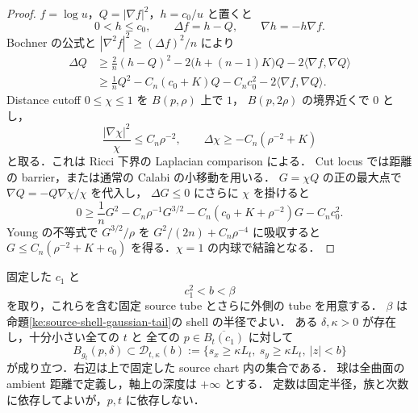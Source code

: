 \begin{proof}
$f=\log u$，$Q=|\nabla f|^2$，$h=c_0/u$ と置くと
\[
 0<h\le c_0,\qquad \Delta f=h-Q,\qquad \nabla h=-h\nabla f.
\]
Bochner の公式と $|\nabla^2 f|^2\ge(\Delta f)^2/n$ により
\begin{align*}
 \Delta Q
 &\ge \frac2n(h-Q)^2
      -2\bigl(h+(n-1)K\bigr)Q
      -2\langle\nabla f,\nabla Q\rangle\\
 &\ge \frac1n Q^2
      -C_n(c_0+K)Q-C_nc_0^2
      -2\langle\nabla f,\nabla Q\rangle.
\end{align*}
Distance cutoff $0\le\chi\le1$ を $B(p,\rho)$ 上で $1$，
$B(p,2\rho)$ の境界近くで $0$ とし，
\[
 \frac{|\nabla\chi|^2}{\chi}\le C_n\rho^{-2},\qquad
 \Delta\chi\ge-C_n(\rho^{-2}+K)
\]
と取る．これは Ricci 下界の Laplacian comparison による．
Cut locus では距離の barrier，または通常の Calabi の小移動を用いる．
$G=\chi Q$ の正の最大点で $\nabla Q=-Q\nabla\chi/\chi$ を代入し，
$\Delta G\le0$ にさらに $\chi$ を掛けると
\[
 0\ge \frac1n G^2-C_n\rho^{-1}G^{3/2}
       -C_n(c_0+K+\rho^{-2})G-C_nc_0^2.
\]
Young の不等式で $G^{3/2}/\rho$ を $G^2/(2n)+C_n\rho^{-4}$ に吸収すると
$G\le C_n(\rho^{-2}+K+c_0)$ を得る．$\chi=1$ の内球で結論となる．
\end{proof}

\begin{proposition}
\label{ke:source-potential-buffer}
固定した $c_1$ と
\[
 c_1^2<b<\beta
\]
を取り，これらを含む固定 source tube とさらに外側の tube を用意する．
$\beta$ は命題\ref{ke:source-shell-gaussian-tail}の shell の半径でよい．
ある $\delta,\kappa>0$ が存在し，十分小さい全ての $t$ と
全ての $p\in\overline{B_t(c_1)}$ に対して
\begin{equation}\label{ke:eq:source-potential-buffer}
 B_{g_t}(p,\delta)
 \subset\mathcal D_{t,\kappa}(b)
 :=\{s_x\ge\kappa L_t,\ s_y\ge\kappa L_t,\ |z|<b\}
\end{equation}
が成り立つ．右辺は上で固定した source chart 内の集合である．
球は全曲面の ambient 距離で定義し，軸上の深度は $+\infty$ とする．
定数は固定半径，族と次数に依存してよいが，$p,t$ に依存しない．
\end{proposition}


